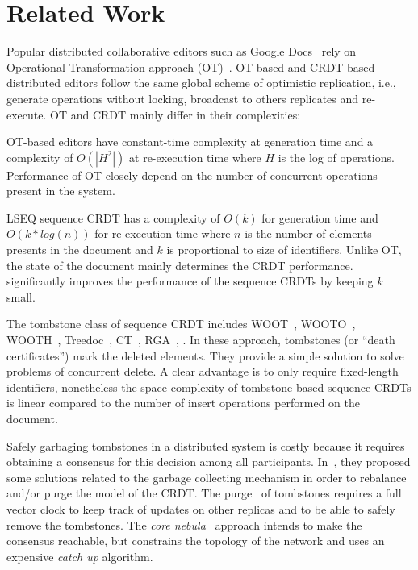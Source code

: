 \section{Related Work}
\label{sec:relatedwork}

Popular distributed collaborative editors such as Google
Docs~\cite{nichols1995high} rely on Operational Transformation approach
(OT)~\cite{sun1998operational,sun1998achieving}.  OT-based and CRDT-based
distributed editors follow the same global scheme of optimistic replication,
i.e., generate operations without locking, broadcast to others replicates and
re-execute. OT and CRDT mainly differ in their complexities:
\begin{inparaenum}[(i)]
\item OT-based editors have constant-time complexity at generation time and a
  complexity of $O(|H^{2}|)$ at re-execution time where $H$ is the log of
  operations. Performance of OT closely depend on the number of concurrent
  operations present in the system.
\item LSEQ sequence CRDT has a complexity of $O(k)$ for generation time and
  $O(k*log(n))$ for re-execution time where $n$ is the number of elements
  presents in the document and $k$ is proportional to size of
  identifiers. Unlike OT, the state of the document mainly determines the CRDT
  performance. \NAME{} significantly improves the performance of the sequence
  CRDTs by keeping $k$ small.
\end{inparaenum}

The tombstone class of sequence CRDT includes WOOT~\cite{oster2006data},
WOOTO~\cite{weiss2007wooki}, WOOTH~\cite{ahmed2011evaluating},
Treedoc~\cite{preguica2009commutative}, CT~\cite{grishchenko2010deep},
RGA~\cite{roh2011replicated}, \cite{Yu2012stringwise}. In these approach,
tombstones (or ``death certificates'') mark the deleted elements. They provide
a simple solution to solve problems of concurrent delete. A clear advantage is
to only require fixed-length identifiers, nonetheless the space complexity of
tombstone-based sequence CRDTs is linear compared to the number of insert
operations performed on the document.

Safely garbaging tombstones in a distributed system is costly because it
requires obtaining a consensus for this decision among all participants.
In~\cite{roh2011replicated, letia2009crdts}, they proposed some solutions
related to the garbage collecting mechanism in order to rebalance and/or purge
the model of the CRDT.  The purge~\cite{roh2011replicated} of tombstones
requires a full vector clock to keep track of updates on other replicas and to
be able to safely remove the tombstones. The \emph{core
  nebula}~\cite{letia2009crdts} approach intends to make the consensus
reachable, but constrains the topology of the network and uses an expensive
\emph{catch up} algorithm.

